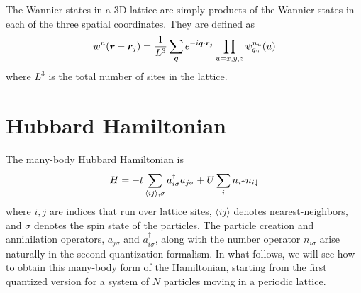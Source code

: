 The Wannier states in a 3D lattice are simply products of the Wannier states in
each of the three spatial coordinates.  They are defined as 
\begin{equation}
 w^{n}(\bm{r}-\bm{r}_{j}) =  \frac{1}{L^{3}} \sum_{\bm{q}} e^{-i \bm{q}\cdot\bm{r}_{j} }
     \prod_{u=x,y,z}  \psi_{q_{u}}^{n_{u}}(u) 
 \label{eq:wannier3D}
\end{equation}
where $L^{3}$ is the total number of sites in the lattice. 

\section{Hubbard Hamiltonian}

The many-body Hubbard Hamiltonian is 
\begin{equation}
  H =  
-t \sum_{ \langle ij \rangle, \sigma   } 
          a_{i\sigma}^{\dagger}a_{j\sigma} \\
         + U\sum_{i} n_{i \uparrow } n_{i \downarrow}  
\end{equation}
where $i,j$ are indices that run over lattice sites, $\langle ij \rangle$
denotes nearest-neighbors, and $\sigma$ denotes the spin state of the
particles.  The particle creation and annihilation operators,  $a_{j\sigma}$
and $a_{i\sigma}^{\dagger}$,  along with the number operator $n_{i\sigma}$
arise naturally in the second quantization formalism. In what follows, we will
see how to obtain this many-body form of the Hamiltonian, starting from the
first quantized version for a system of $N$ particles moving in a periodic
lattice. 


